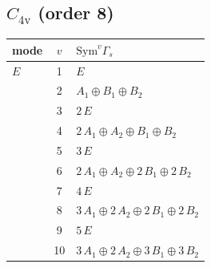 \documentclass[11pt]{article}
\begin{document}
\subsection*{$C_{4\mathrm{v}}$ \quad (order 8)}
\begin{longtable}{l c p{}}
\hline mode & $v$ & $\mathrm{Sym}^v\Gamma_s$\\ \hline\endhead
$E$ & 1 & $E$\\
 & 2 & $A_{1}\oplus B_{1}\oplus B_{2}$\\
 & 3 & $2\,E$\\
 & 4 & $2\,A_{1}\oplus A_{2}\oplus B_{1}\oplus B_{2}$\\
 & 5 & $3\,E$\\
 & 6 & $2\,A_{1}\oplus A_{2}\oplus 2\,B_{1}\oplus 2\,B_{2}$\\
 & 7 & $4\,E$\\
 & 8 & $3\,A_{1}\oplus 2\,A_{2}\oplus 2\,B_{1}\oplus 2\,B_{2}$\\
 & 9 & $5\,E$\\
 & 10 & $3\,A_{1}\oplus 2\,A_{2}\oplus 3\,B_{1}\oplus 3\,B_{2}$\\
\hline
\end{longtable}
\end{document}

